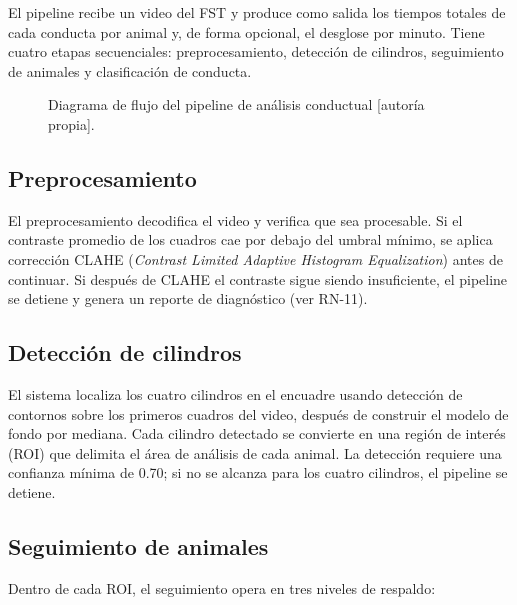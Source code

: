 El pipeline recibe un video del FST y produce como salida los tiempos totales de cada
conducta por animal y, de forma opcional, el desglose por minuto. Tiene cuatro etapas
secuenciales: preprocesamiento, detección de cilindros, seguimiento de animales y
clasificación de conducta.

\begin{figure}[ht]
\centering
\caption{Diagrama de flujo del pipeline de análisis conductual [autoría propia].}
\label{fig:pipeline}
\end{figure}

\subsection{Preprocesamiento}

El preprocesamiento decodifica el video y verifica que sea procesable. Si el contraste
promedio de los cuadros cae por debajo del umbral mínimo, se aplica corrección CLAHE
(\textit{Contrast Limited Adaptive Histogram Equalization}) \cite{bradski2000} antes
de continuar. Si después de CLAHE el contraste sigue siendo insuficiente, el pipeline
se detiene y genera un reporte de diagnóstico (ver RN-11).

\subsection{Detección de cilindros}

El sistema localiza los cuatro cilindros en el encuadre usando detección de contornos
sobre los primeros cuadros del video, después de construir el modelo de fondo por
mediana. Cada cilindro detectado se convierte en una región de interés (ROI) que
delimita el área de análisis de cada animal. La detección requiere una confianza mínima
de 0.70; si no se alcanza para los cuatro cilindros, el pipeline se detiene.

\subsection{Seguimiento de animales}

Dentro de cada ROI, el seguimiento opera en tres niveles de respaldo:

